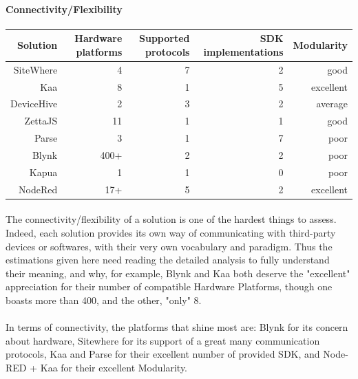 \documentclass{article}
\begin{document}
\paragraph{Connectivity/Flexibility}

\begin{center}
\begin{tabular}{r|r|r|r|r}
Solution & Hardware platforms & Supported protocols & SDK implementations & Modularity \\ \hline
SiteWhere & \cellcolor{orange!25}4 & \cellcolor{green!25}7 & \cellcolor{orange!25}2 & \cellcolor{blue!10}good \\
Kaa & \cellcolor{green!25}8 & \cellcolor{red!25}1 & \cellcolor{green!25}5 & \cellcolor{green!25}excellent \\
DeviceHive & \cellcolor{red!25}2 & \cellcolor{orange!25}3 & \cellcolor{orange!25}2 & \cellcolor{yellow!25}average \\
ZettaJS & \cellcolor{green!25}11 & \cellcolor{red!25}1 & \cellcolor{red!25}1 & \cellcolor{blue!10}good \\
Parse & \cellcolor{orange!25}3 & \cellcolor{red!25}1 & \cellcolor{green!25}7 & \cellcolor{orange!25}poor \\
Blynk & \cellcolor{green!25}400+ & \cellcolor{orange!25}2 & \cellcolor{orange!25}2 & \cellcolor{orange!25}poor \\
Kapua & \cellcolor{red!25}1 & \cellcolor{red!25}1 & \cellcolor{red!25}0 & \cellcolor{orange!25}poor \\
NodeRed & \cellcolor{green!25}17+ & \cellcolor{green!25}5 & \cellcolor{orange!25}2 & \cellcolor{green!25}excellent \\
\end{tabular}
\end{center}

\paragraph{} The connectivity/flexibility of a solution is one of the hardest things to assess. Indeed, each solution provides its own way of communicating with third-party devices or softwares, with their very own vocabulary and paradigm. Thus the estimations given here need reading the detailed analysis to fully understand their meaning, and why, for example, Blynk and Kaa both deserve the "excellent" appreciation for their number of compatible Hardware Platforms, though one boasts more than 400, and the other, "only" 8.

\paragraph{} In terms of connectivity, the platforms that shine most are: Blynk for its concern about hardware, Sitewhere for its support of a great many communication protocols, Kaa and Parse for their excellent number of provided SDK, and Node-RED + Kaa for their excellent Modularity.
\end{document}

